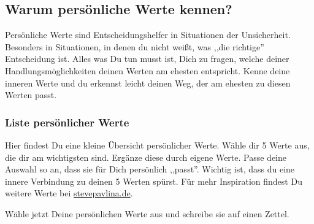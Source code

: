 \documentclass[../Lebensziel.tex]{subfiles}
\begin{document}
\subsection{Warum persönliche Werte kennen?}
Persönliche Werte sind Entscheidungshelfer in Situationen der Unsicherheit. Besonders in Situationen, in denen du nicht weißt, was ,,die richtige'' Entscheidung ist. Alles was Du tun musst ist, Dich zu fragen, welche deiner Handlungsmöglichkeiten deinen Werten am ehesten entspricht. Kenne deine inneren Werte und du erkennst leicht deinen Weg, der am ehesten zu diesen Werten passt.

\subsubsection{Liste persönlicher Werte}
Hier findest Du eine kleine Übersicht persönlicher Werte. Wähle dir 5 Werte aus, die dir am wichtigsten sind. Ergänze diese durch eigene Werte. Passe deine Auswahl so an, dass sie für Dich persönlich ,,passt''. Wichtig ist, dass du eine innere Verbindung zu deinen 5 Werten spürst. Für mehr Inspiration findest Du weitere Werte bei \href{https://stevepavlina.de/werte-liste/}{stevepavlina.de}.

Wähle jetzt Deine persönlichen Werte aus und schreibe sie auf einen Zettel.
\end{document}
